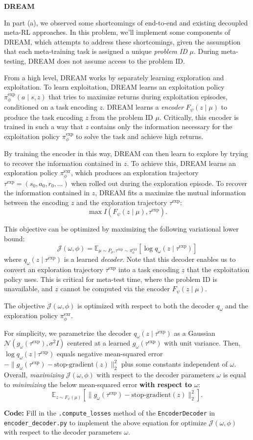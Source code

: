 \item {} \textbf{DREAM}

In part (a), we observed some shortcomings of end-to-end and existing decoupled meta-RL approaches. In this problem, we'll implement some components of DREAM, which attempts to address these shortcomings, given the assumption that each meta-training task is assigned a unique \emph{problem ID} $\mu$. During meta-testing, DREAM does not assume access to the problem ID.

From a high level, DREAM works by separately learning exploration and exploitation. To learn exploitation, DREAM learns an exploitation policy $\pi_\phi^{\text{exp}}(a \mid s, z)$ that tries to maximize returns during exploitation episodes, conditioned on a task encoding $z$. DREAM learns a \emph{encoder} $F_\psi(z \mid \mu)$ to produce the task encoding $z$ from the problem ID $\mu$. Critically, this encoder is trained in such a way that $z$ contains only the information necessary for the exploitation policy $\pi_\phi^{\text{exp}}$ to solve the task and achieve high returns.

By training the encoder in this way, DREAM can then learn to explore by trying to recover the information contained in $z$. To achieve this, DREAM learns an exploration policy $\pi_\phi^{\text{exr}}$, which produces an exploration trajectory $\tau^{\text{exp}} = (s_0, a_0, r_0, \ldots)$ when rolled out during the exploration episode. To recover the information contained in $z$, DREAM fits a maximize the mutual information between the encoding $z$ and the exploration trajectory $\tau^{\text{exp}}$:
\[
\max I(F_\psi(z \mid \mu), \tau^{\text{exp}}).
\]

This objective can be optimized by maximizing the following variational lower bound:
\[
\mathcal{J}(\omega, \phi) = \mathbb{E}_{\mu \sim P_\mu, \tau^{\text{exp}} \sim \pi_\phi^{\text{exr}}}[\log q_\omega(z \mid \tau^{\text{exp}})]
\]
where $q_\omega(z \mid \tau^{\text{exp}})$ is a learned \emph{decoder}. Note that this decoder enables us to convert an exploration trajectory $\tau^{\text{exp}}$ into a task encoding $z$ that the exploitation policy uses. This is critical for meta-test time, where the problem ID is unavailable, and $z$ cannot be computed via the encoder $F_\psi(z \mid \mu)$.

The objective $\mathcal{J}(\omega, \phi)$ is optimized with respect to both the decoder $q_\omega$ and the exploration policy $\pi_\phi^{\text{exr}}$.


For simplicity, we parametrize the decoder $q_\omega(z \mid \tau^{\text{exp}})$ as a Gaussian $\mathcal{N}(g_\omega(\tau^{\text{exp}}), \sigma^2 I)$ centered at a learned $g_\omega(\tau^{\text{exp}})$ with unit variance. Then, $\log q_\omega(z \mid \tau^{\text{exp}})$ equals negative mean-squared error $-\|g_\omega(\tau^{\text{exp}}) - \text{stop-gradient}(z)\|_2^2$ plus some constants independent of $\omega$. Overall, \emph{maximizing} $\mathcal{J}(\omega, \phi)$ with respect to the decoder parameters $\omega$ is equal to \emph{minimizing} the below mean-squared error \textbf{with respect to} $\omega$:
\[
\mathbb{E}_{z \sim F_\psi(\mu)} \left[\|g_\omega(\tau^{\text{exp}}) - \text{stop-gradient}(z)\|_2^2\right].
\]
    
\textbf{Code:} Fill in the \texttt{.compute\_losses} method of the \texttt{EncoderDecoder} in \texttt{encoder\_decoder.py} to implement the above equation for optimize $\mathcal{J}(\omega, \phi)$ with respect to the decoder parameters $\omega$.

